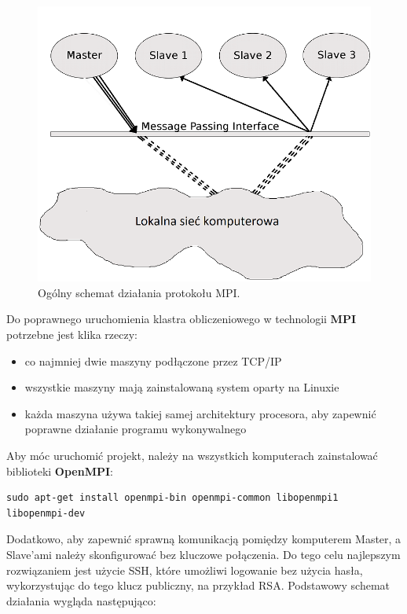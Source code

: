 \documentclass[a4paper,12pt]{article}		%
\begin{document}
\begin{figure}[h]
\centering
\includegraphics[scale=0.6]{Resources/mpi.jpg}
\caption{Ogólny schemat działania protokołu MPI.} 
\label{fig:mpi.jpg}
\end{figure}

Do poprawnego uruchomienia klastra obliczeniowego w technologii \textbf{MPI} potrzebne jest klika rzeczy:
\begin{itemize}
\item co najmniej dwie maszyny podłączone przez TCP/IP
\item wszystkie maszyny mają zainstalowaną system oparty na Linuxie
\item każda maszyna używa takiej samej architektury procesora, aby zapewnić poprawne działanie programu wykonywalnego
\end{itemize}

Aby móc uruchomić projekt, należy na wszystkich komputerach zainstalować biblioteki \textbf{OpenMPI}:

\begin{lstlisting}
sudo apt-get install openmpi-bin openmpi-common libopenmpi1 libopenmpi-dev
\end{lstlisting}

Dodatkowo, aby zapewnić sprawną komunikacją pomiędzy komputerem Master, a Slave’ami należy skonfigurować bez kluczowe połączenia. Do tego celu najlepszym rozwiązaniem jest użycie SSH, które umożliwi logowanie bez użycia hasła, wykorzystując do tego klucz publiczny, na przykład RSA. Podstawowy schemat działania wygląda następująco:
\end{document}
